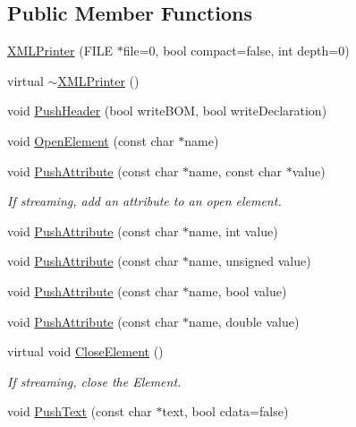 \subsection*{Public Member Functions}
\begin{DoxyCompactItemize}
\item 
\hyperlink{classtinyxml2_1_1_x_m_l_printer_aa6d3841c069085f5b8a27bc7103c04f7}{X\-M\-L\-Printer} (F\-I\-L\-E $\ast$file=0, bool compact=false, int depth=0)
\item 
virtual \hyperlink{classtinyxml2_1_1_x_m_l_printer_af4caefa48ea6436898fb1807de8d14c0}{$\sim$\-X\-M\-L\-Printer} ()
\item 
void \hyperlink{classtinyxml2_1_1_x_m_l_printer_a178c608ce8476043d5d6513819cde903}{Push\-Header} (bool write\-B\-O\-M, bool write\-Declaration)
\item 
void \hyperlink{classtinyxml2_1_1_x_m_l_printer_aa10d330818dbc31b44e9ffc27618bdfb}{Open\-Element} (const char $\ast$name)
\item 
void \hyperlink{classtinyxml2_1_1_x_m_l_printer_a9a4e2c9348b42e147629d5a99f4af3f0}{Push\-Attribute} (const char $\ast$name, const char $\ast$value)
\begin{DoxyCompactList}\small\item\em If streaming, add an attribute to an open element. \end{DoxyCompactList}\item 
void \hyperlink{classtinyxml2_1_1_x_m_l_printer_a69120c82088597372d28d0a98f2ee7a1}{Push\-Attribute} (const char $\ast$name, int value)
\item 
void \hyperlink{classtinyxml2_1_1_x_m_l_printer_aa41039e51990aaf5342f3e0575a692c4}{Push\-Attribute} (const char $\ast$name, unsigned value)
\item 
void \hyperlink{classtinyxml2_1_1_x_m_l_printer_a51f7950d7b7a19f0d3a0d549a318d45f}{Push\-Attribute} (const char $\ast$name, bool value)
\item 
void \hyperlink{classtinyxml2_1_1_x_m_l_printer_a1714867af40e68ca404c3e84b6cac2a6}{Push\-Attribute} (const char $\ast$name, double value)
\item 
virtual void \hyperlink{classtinyxml2_1_1_x_m_l_printer_aed6cce4bd414a78b3e2a824803c3ec42}{Close\-Element} ()
\begin{DoxyCompactList}\small\item\em If streaming, close the Element. \end{DoxyCompactList}\item 
void \hyperlink{classtinyxml2_1_1_x_m_l_printer_a1cc16a9362df4332012cb13cff6441b3}{Push\-Text} (const char $\ast$text, bool cdata=false)

\end{DoxyCompactItemize}
